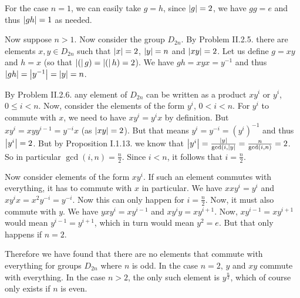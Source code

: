 \begin{problem}
\end{problem}

\begin{solution}
	For the case $n=1$, we can easily take $g=h$, since $\left|g\right|=2$, we have $gg=e$ and thus $\left|gh\right|=1$ as needed.
	
	Now suppose $n > 1$. Now consider the group $D_{2n}$. By Problem II.2.5. there are elements $x,y \in D_{2n}$ such that $\left|x\right|=2$, $\left|y\right|=n$ and $\left|xy\right|=2$. Let us define $g = xy$ and $h = x$ (so that $\left|(\right|g)=\left|(\right|h)=2$). We have $gh = xyx = y^{-1}$ and thus $\left|gh\right|=\left|y^{-1}\right|=\left|y\right|=n$.
\end{solution}

\begin{problem}
\end{problem}

\begin{solution}
	By Problem II.2.6. any element of $D_{2n}$ can be written as a product $xy^i$ or $y^i$, $0 \leq i < n$. Now, consider the elements of the form $y^i$, $0 < i < n$. For $y^i$ to commute with $x$, we need to have $x y^i=y^i x$ by definition. But $x y^i = x y y^{i-1} = y^{-i} x$ (as $\left|xy\right|=2$). But that means $y^i = y^{-i}=(y^i)^{-1}$ and thus $\left|y^i\right|=2$. But by Proposition I.1.13. we know that $\left|y^i\right|=\frac{\left|y\right|}{\gcd(i, \left|y\right|}=\frac{n}{\gcd(i,n)}=2$. So in particular $\gcd(i,n)=\frac{n}{2}$. Since $i < n$, it follows that $i=\frac{n}{2}$.
		
	Now consider elements of the form $xy^i$. If such an element commutes with everything, it has to commute with $x$ in particular. We have $xxy^i=y^i$ and $xy^ix=x^2y^{-i}=y^{-i}$. Now this can only happen for $i = \frac{n}{2}$. Now, it must also commute with $y$. We have $yxy^i=xy^{i-1}$ and $xy^{i}y=xy^{i+1}$. Now, $xy^{i-1}=xy^{i+1}$ would mean $y^{i-1}=y^{i+1}$, which in turn would mean $y^2=e$. But that only happens if $n=2$.
	
	Therefore we have found that there are no elements that commute with everything for groups $D_{2n}$ where $n$ is odd. In the case $n=2$, $y$ and $xy$ commute with everything. In the case $n > 2$, the only such element is $y^{\frac{n}{2}}$, which of course only exists if $n$ is even.
\end{solution}

\begin{problem}
\end{problem}

